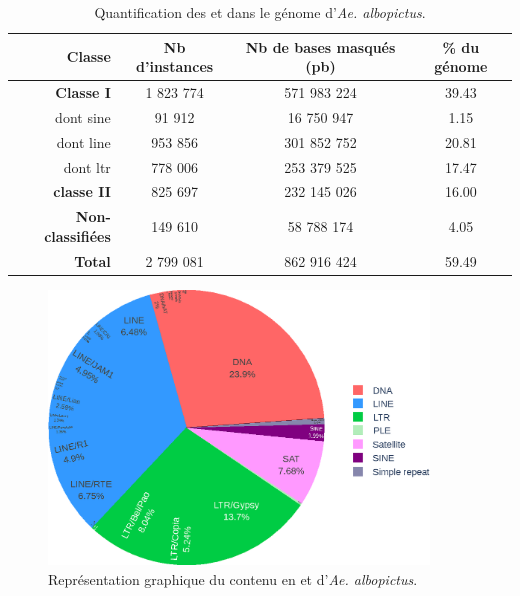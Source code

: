 \documentclass[10pt]{article}
\begin{document}
\begin{table}[H]
    \centering
    \begin{tabular}{r|c|c|c}
        \toprule
        \textbf{Classe} & \textbf{Nb d'instances} &  \textbf{Nb de bases masqués} (pb) & \textbf{\% du génome}\\
        \midrule
        \rowcolor{gray!10} 
        \textbf{Classe I} & 1 823 774 & 571 983 224 & 39.43 \\
        dont \acrshort{sine} & 91 912 & 16 750 947 & 1.15 \\
        \rowcolor{gray!10}
        dont \acrshort{line} & 953 856 & 301 852 752 & 20.81 \\
        dont \acrshort{ltr} & 778 006 & 253 379 525 & 17.47 \\
        \rowcolor{gray!10}
        \textbf{classe II} & 825 697 & 232 145 026 & 16.00 \\
        \textbf{Non-classifiées} & 149 610 & 58 788 174 & 4.05 \\
        \midrule
        \textbf{Total} & 2 799 081 & 862 916 424 & 59.49 \\
        \bottomrule
    \end{tabular}
    \caption{Quantification des \acrlong{et} dans le génome d'\textit{Ae. albopictus}.}
    \label{tab:rm_quantif}
\end{table}

\bigskip

\begin{figure}[H]
    \centering
    \includegraphics[width=0.9\textwidth]{img/plots/pie_chart.eps}
    \caption{Représentation graphique du contenu en \acrshort{et} d'\textit{Ae. albopictus}.}%
    \label{fig:pie_chart}
\end{figure}
\end{document}
